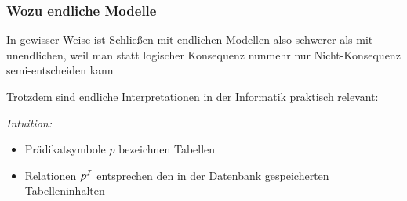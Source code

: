 \documentclass[onlymath]{beamer}
\begin{document}

\begin{frame}\frametitle{Wozu endliche Modelle}

In gewisser Weise ist Schließen mit endlichen Modellen also schwerer als mit unendlichen, weil man statt logischer Konsequenz nunmehr nur Nicht-Konsequenz semi-entscheiden kann
\bigskip

Trotzdem sind endliche Interpretationen in der Informatik praktisch relevant:\medskip

\emph{Intuition:}
\begin{itemize}
\item Prädikatsymbole $p$ bezeichnen Tabellen
\item Relationen $p^{\mathcal{I}}$ entsprechen den in der Datenbank gespeicherten Tabelleninhalten
\end{itemize}

\end{frame}
\end{document}
